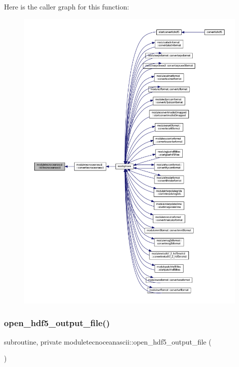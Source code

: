 Here is the caller graph for this function\+:\nopagebreak
\begin{figure}[H]
\begin{center}
\leavevmode
\includegraphics[width=350pt]{namespacemoduletecnoceanascii_a324e7114be8b0d39a6c4a80c55f2dcc1_icgraph}
\end{center}
\end{figure}
\mbox{\label{namespacemoduletecnoceanascii_a59efcea92a5574ed7914c0950859e175}} 
\subsubsection{\texorpdfstring{open\+\_\+hdf5\+\_\+output\+\_\+file()}{open\_hdf5\_output\_file()}}
{\footnotesize\ttfamily subroutine, private moduletecnoceanascii\+::open\+\_\+hdf5\+\_\+output\+\_\+file (\begin{DoxyParamCaption}{ }\end{DoxyParamCaption})\hspace{0.3cm}{\ttfamily [private]}}

